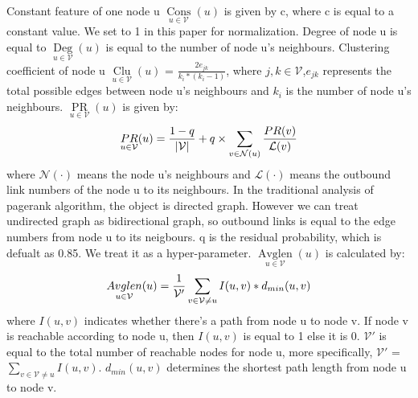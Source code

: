 \documentclass[sigconf]{acmart}
\begin{document}
Constant feature of one node u $\mathop{Cons}\limits_{u \in \mathcal{V}}(u)$ is given by c, 
where c is equal to a constant value. We set to 1 in this paper for normalization. 
Degree of node u is equal to $\mathop{Deg}\limits_{u \in \mathcal{V}}(u)$ is equal to the number of node u's neighbours. 
Clustering coefficient of node u $\mathop{Clu}\limits_{u \in \mathcal{V}}(u)$ = $\frac{2e_{jk}}{k_{i} * (k_{i} - 
1)}$, where $j,k \in \mathcal{V}$,$e_{jk}$ represents the total possible edges between node u's neighbours and
$k_{i}$ is the number of node u's neighbours. $\mathop{PR}\limits_{u \in \mathcal{V}}(u)$ is given by:
\begin{equation}
  \mathop{PR}\limits_{u \in \mathcal{V}}(u) = \frac{1-q}{|\mathcal V|} + q \times \sum_{v \in {\mathcal N} 
  (u)}\frac{\mathop{PR}(v)}{\mathcal L(v)}\\
\end{equation}
where $\mathcal N(\cdot)$ means the node u's neighbours and $\mathcal L(\cdot)$ means the outbound link numbers of the node u
to its neighbours. In the traditional analysis of pagerank algorithm, the object is directed graph. However we can treat
undirected graph as bidirectional graph, so outbound links is equal to the edge numbers from node u to its neigbours.
q is the residual probability, which is defualt as 0.85. We treat it as a hyper-parameter. $\mathop{Avglen}
\limits_{u \in \mathcal{V}}(u)$ is calculated by:
\begin{equation}
  \mathop{Avglen}
\limits_{u \in \mathcal{V}}(u) = \frac{1}{\mathcal V '}\sum_{v \in {\mathcal V}\neq u} I(u,v) * d_{min}(u,v)\\
\end{equation}
where $I(u,v)$ indicates whether there's a path from node u to node v. If node v is reachable according to node u,
then $I(u,v)$ is equal to 1 else it is 0. $\mathcal V'$ is equal to the total number of reachable nodes for node u,
more specifically, $\mathcal V'$ = $\sum_{v \in {\mathcal V}\neq u} I(u,v) $. $d_{min}(u,v)$ determines the shortest path
length from node u to node v. 
\end{document}
